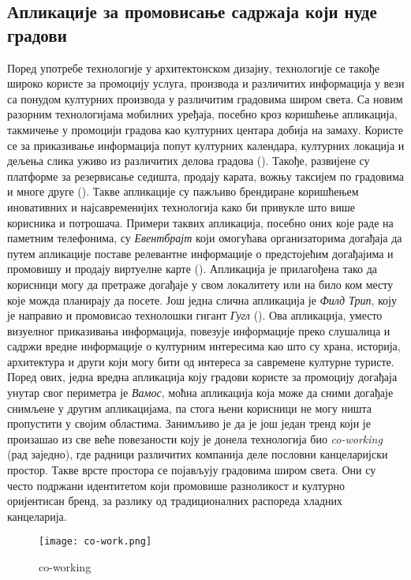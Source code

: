 \documentclass{article}
\begin{document}
\subsection{Апликације за промовисање садржаја који нуде градови}
Поред употребе технологије у архитектонском дизајну, технологије се такође широко користе за промоцију услуга, производа и различитих информација у вези са понудом културних производа у различитим градовима широм света. Са новим разорним технологијама мобилних уређаја, посебно кроз коришћење апликација, такмичење у промоцији градова као културних центара добија на замаху. Користе се за приказивање информација попут културних календара, културних локација и дељења слика уживо из различитих делова градова (\cite{pietrol}). Такође, развијене су платформе за резервисање седишта, продају карата, вожњу таксијем по градовима и многе друге (\cite{mckinsey}). Такве апликације су пажљиво брендиране коришћењем иновативних и најсавременијих технологија како би привукле што више корисника и потрошача. Примери таквих апликација, посебно оних које раде на паметним телефонима, су \textit{Евентбрајт} који омогућава организаторима догађаја да путем апликације поставе релевантне информације о предстојећим догађајима и промовишу и продају виртуелне карте (\cite{jamaluddina}). Апликација је прилагођена тако да корисници могу да претраже догађаје у свом локалитету или на било ком месту које можда планирају да посете. Још једна слична апликација је \textit{Филд Трип}, коју је направио и промовисао технолошки гигант \textit{Гугл} (\cite{ingrahamn}). Ова апликација, уместо визуелног приказивања информација, повезује информације преко слушалица и садржи вредне информације о културним интересима као што су храна, историја, архитектура и други који могу бити од интереса за савремене културне туристе. Поред ових, једна вредна апликација коју градови користе за промоцију догађаја унутар свог периметра је \textit{Вамос}, моћна апликација која може да сними догађаје снимљене у другим апликацијама, па стога њени корисници не могу ништа пропустити у својим областима. Занимљиво је да је још један тренд који је произашао из све веће повезаности коју је донела технологија био \textit{co-working} (рад заједно), где радници различитих компанија деле пословни канцеларијски простор. Такве врсте простора се појављују градовима широм света. Они су често подржани идентитетом који промовише разноликост и културно оријентисан бренд, за разлику од традиционалних распореда хладних канцеларија.

\begin{figure}[H]
\centering
\texttt{[image: co-work.png]}
\caption{co-working}
\end{figure}
\end{document}
